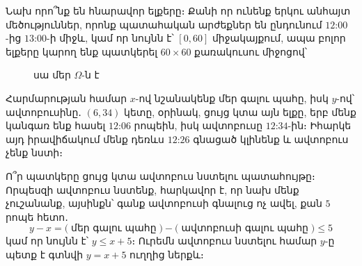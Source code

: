 Նախ որո՞նք են հնարավոր ելքերը։ Քանի որ ունենք երկու անհայտ մեծություններ, որոնք պատահական արժեքներ են ընդունում $12$:$00$-ից $13$:$00$-ի միջև, կամ որ նույնն է՝ $[0, 60]$ միջակայքում, ապա բոլոր ելքերը կարող ենք պատկերել $60 \times 60$ քառակուսու միջոցով՝
\begin{figure}[h]
\centering    
\caption*{սա մեր $\Omega$-ն է}
\end{figure}

Հարմարության համար $x$-ով նշանակենք մեր գալու պահը, իսկ $y$-ով՝ ավտոբուսինը․ $(6, 34)$ կետը, օրինակ, ցույց կտա այն ելքը, երբ մենք կանգառ ենք հասել $12$:$06$ րոպեին, իսկ ավտոբուսը $12$:$34$-ին։ Իհարկե այդ իրավիճակում մենք դեռևս $12$:$26$ գնացած կլինենք և ավտոբուս չենք նստի։

Ո՞ր պատկերը ցույց կտա ավտոբուս նստելու պատահույթը։ Որպեսզի ավտոբուս նստենք, հարկավոր է, որ նախ մենք չուշանանք, այսինքն՝ գանք ավտոբուսի գնալուց ոչ ավել, քան $5$ րոպե հետո․
\[
y - x = \Big(\;\text{մեր գալու պահը}\;\Big) - \Big(\;\text{ավտոբուսի գալու պահը}\;\Big) \le 5
\]
կամ որ նույնն է՝ $y \le x + 5$։ Ուրեմն ավտոբուս նստելու համար $y$-ը պետք է գտնվի $y=x+5$ ուղղից ներքև։

\begin{figure}[t]
\centering

\begin{minipage}{0.48\textwidth}
\centering
{}
\end{minipage}
\hfill
\begin{minipage}{0.48\textwidth}
\centering
{}
\end{minipage}

\end{figure}

